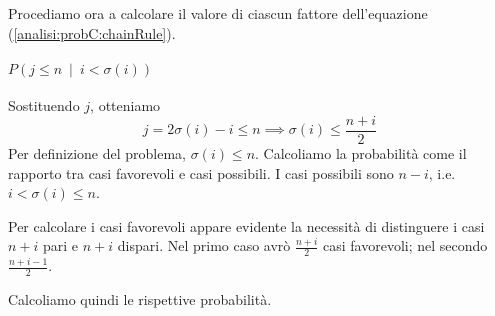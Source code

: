 \documentclass[../../main.tex]{subfiles}
\begin{document}
Procediamo ora a calcolare il valore di ciascun fattore dell'equazione (\ref{analisi:probC:chainRule}).
\paragraph{$P(j \leq n\ \mid\ i < \sigma(i))$}
Sostituendo $j$, otteniamo
$$j = 2\sigma(i) - i \leq n \implies \sigma(i) \leq \frac{n+i}{2}$$
Per definizione del problema, $\sigma(i) \leq n$.
Calcoliamo la probabilità come il rapporto tra casi favorevoli e casi possibili.
I casi possibili sono $n-i$, i.e. $i < \sigma(i) \leq n$.

Per calcolare i casi favorevoli appare evidente la necessità di distinguere i casi $n+i$ pari e $n+i$ dispari.
Nel primo caso avrò $\frac{n+i}{2}$ casi favorevoli; nel secondo $\frac{n+i-1}{2}$.

Calcoliamo quindi le rispettive probabilità.
\end{document}
